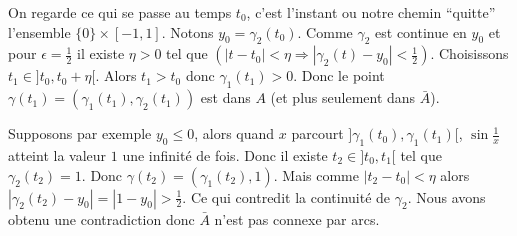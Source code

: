 {\begin{enumerate}
{On regarde ce qui se passe au temps $t_0$, c'est l'instant ou notre chemin ``quitte'' l'ensemble $\{0\}\times [-1,1]$. Notons $y_0 = \gamma_2(t_0)$.
Comme $\gamma_2$ est continue en $y_0$ et pour $\epsilon = \frac 12$ il existe $\eta>0$ tel que $(|t-t_0|<\eta \Rightarrow |\gamma_2(t)-y_0|<\frac12)$.
Choisissons $t_1\in ]t_0,t_0+\eta[$. Alors $t_1>t_0$ donc
$\gamma_1(t_1) > 0$. Donc le point $\gamma(t_1)=(\gamma_1(t_1),\gamma_2(t_1))$ est dans $A$ (et plus seulement dans $\bar A$).

Supposons par exemple $y_0 \le 0$, alors 
quand $x$ parcourt $]\gamma_1(t_0),\gamma_1(t_1)[$, $\sin \frac 1x$ atteint
la valeur $1$ une infinité de fois. Donc il existe $t_2 \in ]t_0,t_1[$ tel que
$\gamma_2(t_2)=1$. Donc $\gamma(t_2) = (\gamma_1(t_2),1)$.
Mais comme $|t_2-t_0|< \eta$ alors $|\gamma_2(t_2)-y_0|=|1-y_0| > \frac 12$.
Ce qui contredit la continuité de $\gamma_2$. Nous avons obtenu une contradiction donc $\bar A$ n'est pas connexe par arcs.}
\end{enumerate}
}